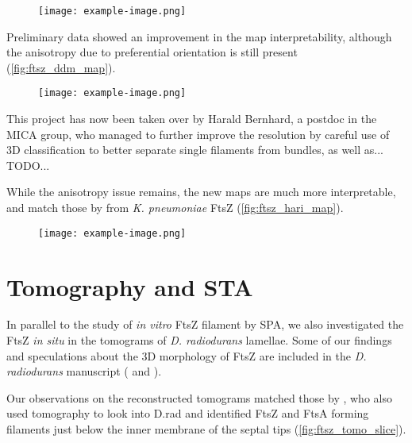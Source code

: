 \begin{figure}[ht]
    \centering
    \texttt{[image: example-image.png]}
    \label{fig:ftsz_ddm_classes}
\end{figure}

Preliminary data showed an improvement in the map interpretability, although the anisotropy due to preferential orientation is still present (\autoref{fig:ftsz_ddm_map}).

\begin{figure}[ht]
    \centering
    \texttt{[image: example-image.png]}
    \label{fig:ftsz_ddm_map}
\end{figure}

This project has now been taken over by Harald Bernhard, a postdoc in the MICA group, who managed to further improve the resolution by careful use of 3D classification to better separate single filaments from bundles, as well as... TODO...

While the anisotropy issue remains, the new maps are much more interpretable, and match those by \citet{fujitaStructuresFtsZSingle2023} from \textit{K. pneumoniae} FtsZ (\autoref{fig:ftsz_hari_map}).

\begin{figure}[ht]
    \centering
    \texttt{[image: example-image.png]}
    \label{fig:ftsz_hari_map}
\end{figure}


\section{Tomography and STA}

In parallel to the study of \textit{in vitro} FtsZ filament by SPA, we also investigated the FtsZ \textit{in situ} in the tomograms of \textit{D. radiodurans} lamellae.
Some of our findings and speculations about the 3D morphology of FtsZ are included in the \textit{D. radiodurans} manuscript ( and ).

Our observations on the reconstructed tomograms matched those by \citet{sextonSuperresolutionConfocalCryoCLEM2022}, who also used tomography to look into D.rad and identified FtsZ and FtsA forming filaments just below the inner membrane of the septal tips (\autoref{fig:ftsz_tomo_slice}). %

